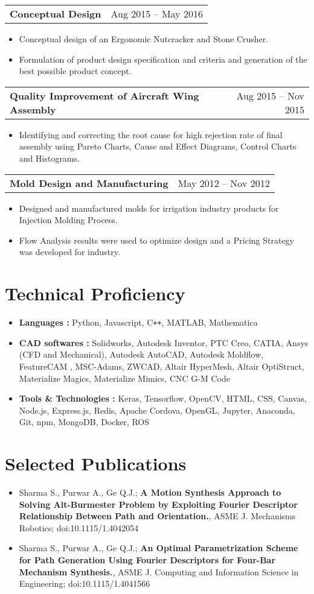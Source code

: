 \documentclass[letterpaper,10pt]{article}
\makeatletter
\newcommand{\resumeHeadingwithDate}[2]{
	\vspace{-1pt}
	\begin{tabular*}{0.97\textwidth}{l@{\extracolsep{\fill}}r}
		\textbf{#1} & #2 \vspace{-2pt}\\
	\end{tabular*}
	\vspace{+2pt}
}
\newcommand{\resumeSection}[1]{
\vspace{-12pt}
\section{\textbf{#1}}
}
\newcommand{\resumeItemListStart}{
\vspace{-7pt}
\begin{itemize}[leftmargin=14pt]
}
\newcommand{\resumeItemListEnd}{
\vspace{+7pt}
\end{itemize}
}
\newcommand{\resumeItem}[1]{
  \item\small{
      {#1 \vspace{-7pt}
      }
  }
}
\makeatother
\begin{document}
	\vspace{-4pt}
	\resumeHeadingwithDate{Conceptual Design}{Aug 2015 -- May 2016}
	\resumeItemListStart
	\resumeItem{Conceptual design of an Ergonomic Nutcracker and Stone Crusher.}
	\resumeItem{Formulation of product design specification and criteria and generation of the best possible product concept.}
	\resumeItemListEnd
	
	\vspace{-4pt}
	\resumeHeadingwithDate{Quality Improvement of Aircraft Wing Assembly}{Aug 2015 -- Nov 2015}
	\resumeItemListStart
	\resumeItem{Identifying and correcting the root cause for high rejection rate of final assembly using Pareto Charts, Cause and Effect Diagrams, Control Charts and Histograms.}
	\resumeItemListEnd
	
	\vspace{-4pt}
	\resumeHeadingwithDate{Mold Design and Manufacturing}{May 2012 -- Nov 2012}
	\resumeItemListStart
	\resumeItem{Designed and manufactured molds for irrigation industry products for Injection Molding Process.}
	\resumeItem{Flow Analysis results were used to optimize design and a Pricing Strategy was developed for industry.}
	\resumeItemListEnd
    
    
    
\resumeSection{Technical Proficiency}
    \vspace{+7pt}
    \resumeItemListStart
    \resumeItem{\textbf{Languages :} Python, Javascript, C\texttt{++}, MATLAB, Mathematica}
    \resumeItem{\textbf{CAD softwares :} Solidworks, Autodesk Inventor, PTC Creo, CATIA, Ansys (CFD and Mechanical), Autodesk AutoCAD, Autodesk Moldflow, FeatureCAM , MSC-Adams, ZWCAD, Altair HyperMesh, Altair OptiStruct, Materialize Magics, Materialize Mimics, CNC G-M Code}
    \resumeItem{\textbf{Tools \& Technologies :} Keras, Tensorflow, OpenCV, HTML, CSS, Canvas, Node.js, Express.js, Redis, Apache Cordova, OpenGL, Jupyter, Anaconda, Git, npm, MongoDB, Docker, ROS}
    \resumeItemListEnd
    
    
    
\resumeSection{Selected Publications}
	\vspace{+7pt}
	\resumeItemListStart
	\resumeItem{Sharma S., Purwar A., Ge Q.J.; \textbf{A Motion Synthesis Approach to Solving Alt-Burmester Problem by Exploiting Fourier Descriptor Relationship Between Path and Orientation.}, ASME J. Mechanisms Robotics; doi:10.1115/1.4042054}
	\resumeItem{Sharma S., Purwar A., Ge Q.J.; \textbf{An Optimal Parametrization Scheme for Path Generation Using Fourier Descriptors for Four-Bar Mechanism Synthesis.}, ASME J. Computing and Information Science in Engineering; doi:10.1115/1.4041566}
	\resumeItemListEnd
\end{document}
